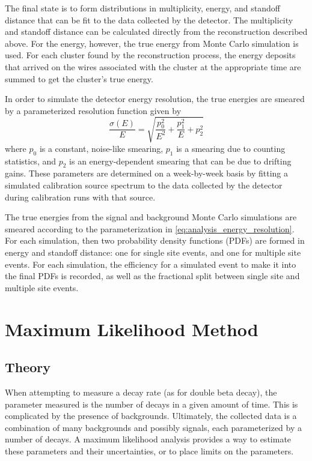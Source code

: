 \documentclass[herrin-thesis.tex]{subfiles}
\begin{document}
The final state is to form distributions in multiplicity, energy, and standoff distance that can be fit to the data collected by the detector. The multiplicity and standoff distance can be calculated directly from the reconstruction described above. For the energy, however, the true energy from Monte Carlo simulation is used. For each cluster found by the reconstruction process, the energy deposits that arrived on the wires associated with the cluster at the appropriate time are summed to get the cluster's true energy.

In order to simulate the detector energy resolution, the true energies are smeared by a parameterized resolution function given by
\begin{equation}
\frac{\sigma(E)}{E} = \sqrt{\frac{p_0^2}{E^2} + \frac{p_1^2}{E} + p_2^2}
\label{eq:analysis_energy_resolution}
\end{equation}
where \(p_0\) is a constant, noise-like smearing, \(p_1\) is a smearing due to counting statistics, and \(p_2\) is an energy-dependent smearing that can be due to drifting gains. These parameters are determined on a week-by-week basis by fitting a simulated calibration source spectrum to the data collected by the detector during calibration runs with that source.

The true energies from the signal and background Monte Carlo simulations are smeared according to the parameterization in \cref{eq:analysis_energy_resolution}. For each simulation, then two probability density functions (PDFs) are formed in energy and standoff distance: one for single site events, and one for multiple site events. For each simulation, the efficiency for a simulated event to make it into the final PDFs is recorded, as well as the fractional split between single site and multiple site events.

\section{Maximum Likelihood Method}
\subsection{Theory}
When attempting to measure a decay rate (as for double beta decay), the parameter measured is the number of decays in a given amount of time. This is complicated by the presence of backgrounds. Ultimately, the collected data is a combination of many backgrounds and possibly signals, each parameterized by a number of decays. A maximum likelihood analysis provides a way to estimate these parameters and their uncertainties, or to place limits on the parameters.
\end{document}
